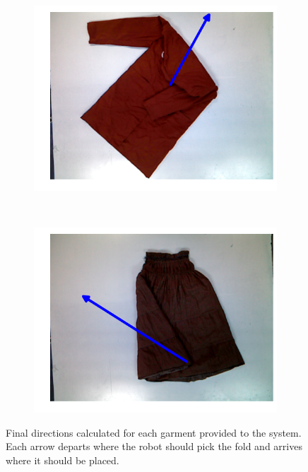 \begin{figure}[htbp]
\begin{subfigure}[l]{0.49\textwidth}
    	\includegraphics[width=\textwidth]
    	{figures/pnp/robe19-direction.pdf}
	\end{subfigure}
	~
    \begin{subfigure}[r]{0.49\textwidth}
	    \centering
    	\includegraphics[width=\textwidth]
    	{figures/pnp/skirt7-direction.pdf}
	\end{subfigure} 
    \caption[Final directions calculated for each garment provided to the system.]
    {Final directions calculated for each garment provided to the system. Each arrow departs where the robot should pick the fold and arrives where it should be placed.}
    \label{fig:directions}
\end{figure}
